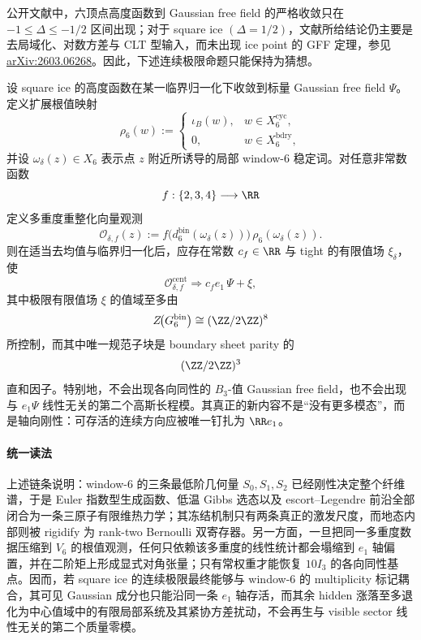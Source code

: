 \noindent
公开文献中，六顶点高度函数到 Gaussian free field 的严格收敛只在 \(-1\le \Delta\le -1/2\) 区间出现；对于 square ice \((\Delta=1/2)\)，文献所给结论仍主要是去局域化、对数方差与 CLT 型输入，而未出现 ice point 的 GFF 定理，参见 \href{https://arxiv.org/abs/2603.06268}{arXiv:2603.06268}。因此，下述连续极限命题只能保持为猜想。

\begin{conjecture}\label{conj:conclusion-window6-icepoint-axial-local-system}
设 square ice 的高度函数在某一临界归一化下收敛到标量 Gaussian free field \(\Psi\)。定义扩展根值映射
\[
\rho_6(w):=
\begin{cases}
\iota_B(w),& w\in X_6^{\mathrm{cyc}},\\
0,& w\in X_6^{\mathrm{bdry}},
\end{cases}
\]
并设 \(\omega_\delta(z)\in X_6\) 表示点 \(z\) 附近所诱导的局部 window-\(6\) 稳定词。对任意非常数函数
\[
f:\{2,3,4\}\longrightarrow \RR
\]
定义多重度重整化向量观测
\[
\mathcal O_{\delta,f}(z)
:=
f\!\bigl(d_6^{\mathrm{bin}}(\omega_\delta(z))\bigr)\,
\rho_6(\omega_\delta(z)).
\]
则在适当去均值与临界归一化后，应存在常数 \(c_f\in\RR\) 与 tight 的有限值场 \(\xi_\delta\)，使
\[
\mathcal O_{\delta,f}^{\mathrm{cent}}
\Longrightarrow
c_f e_1\,\Psi+\xi,
\]
其中极限有限值场 \(\xi\) 的值域至多由
\[
Z\!\bigl(G_6^{\mathrm{bin}}\bigr)\cong (\ZZ/2\ZZ)^8
\]
所控制，而其中唯一规范子块是 boundary sheet parity 的
\[
(\ZZ/2\ZZ)^3
\]
直和因子。特别地，不会出现各向同性的 \(B_3\)-值 Gaussian free field，也不会出现与 \(e_1\Psi\) 线性无关的第二个高斯长程模。其真正的新内容不是“没有更多模态”，而是轴向刚性：可存活的连续方向应被唯一钉扎为 \(\RR e_1\)。
\end{conjecture}



\paragraph{统一读法}
上述链条说明：window-\(6\) 的三条最低阶几何量 \(S_0,S_1,S_2\) 已经刚性决定整个纤维谱，于是 Euler 指数型生成函数、低温 Gibbs 选态以及 escort--Legendre 前沿全部闭合为一条三原子有限维热力学；其冻结机制只有两条真正的激发尺度，而地态内部则被 rigidify 为 rank-two Bernoulli 双寄存器。另一方面，一旦把同一多重度数据压缩到 \(V_6\) 的根值观测，任何只依赖该多重度的线性统计都会塌缩到 \(e_1\) 轴偏置，并在二阶矩上形成显式对角张量；只有常权重才能恢复 \(10I_3\) 的各向同性基点。因而，若 square ice 的连续极限最终能够与 window-\(6\) 的 multiplicity 标记耦合，其可见 Gaussian 成分也只能沿同一条 \(e_1\) 轴存活，而其余 hidden 涨落至多退化为中心值域中的有限局部系统及其紧协方差扰动，不会再生与 visible sector 线性无关的第二个质量零模。

\endinput
